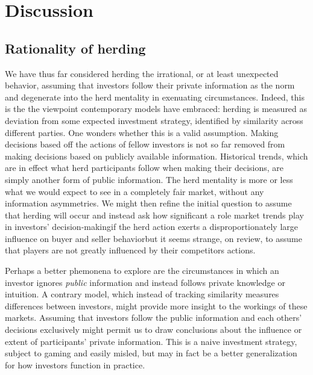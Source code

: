 \documentclass{article}
\begin{document}
\section{Discussion}
\subsection{Rationality of herding}
We have thus far considered herding the irrational, or at least unexpected behavior, assuming that investors follow their private information as the norm and degenerate into the herd mentality in exenuating circumstances.
Indeed, this is the the viewpoint contemporary models have embraced: herding is measured as deviation from some expected investment strategy, identified by similarity across different parties. 
One wonders whether this is a valid assumption. 
Making decisions based off the actions of fellow investors is not so far removed from making decisions based on publicly available information.
Historical trends, which are in effect what herd participants follow when making their decisions, are simply another form of public information. 
The herd mentality is more or less what we would expect to see in a completely fair market, without any information asymmetries. 
We might then refine the initial question to assume that herding will occur and instead ask how significant a role market trends play in investors' decision-making\textemdash if the herd action exerts a disproportionately large influence on buyer and seller behavior\textemdash but it seems strange, on review, to assume that players are not greatly influenced by their competitors actions.

Perhaps a better phemonena to explore are the circumstances in which an investor ignores \emph{public} information and instead follows private knowledge or intuition.
A contrary model, which instead of tracking similarity measures differences between investors, might provide more insight to the workings of these markets.  
Assuming that investors follow the public information and each others' decisions exclusively might permit us to draw conclusions about the influence or extent of participants' private information.
This is a naive investment strategy, subject to gaming and easily misled, but may in fact be a better generalization for how investors function in practice.
\end{document}
